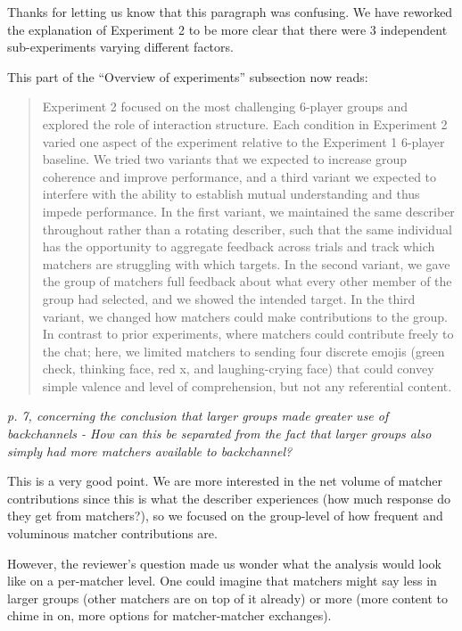 \documentclass{stanfordletter}
\newcommand{\theysaid}[1]{\begin{leftbar} \noindent 
		\textsl{ #1}\end{leftbar}}
\newcommand{\revised}[1]{\begin{quote}	#1 \end{quote}}
\begin{document}
\begin{letter}{}
Thanks for letting us know that this paragraph was confusing. We have reworked the explanation of Experiment 2 to be more clear that there were 3 independent sub-experiments varying different factors. 

This part of the ``Overview of experiments'' subsection now reads: 
          
          \revised{Experiment 2 focused on the most challenging 6-player groups and explored the role of interaction structure. Each condition in Experiment 2 varied one aspect of the experiment relative to the Experiment 1 6-player baseline. We tried two variants that we expected to increase group coherence and improve performance, and a third variant we expected to interfere with the ability to establish mutual understanding and thus impede performance. 
          	In the first variant, we maintained the same describer throughout rather than a rotating describer, such that the same individual has the opportunity to aggregate feedback across trials and track which matchers are struggling with which targets. 
          	In the second variant, we gave the group of matchers full feedback about what every other member of the group had selected, and we showed the intended target. 
          	In the third variant, we changed how matchers could make contributions to the group. In contrast to prior experiments, where matchers could contribute freely to the chat; here, we limited matchers to sending four discrete emojis (green check, thinking face, red x, and laughing-crying face) that could convey simple valence and level of comprehension, but not any referential content.}
          
          \theysaid{p. 7, concerning the conclusion that larger groups made greater use of backchannels - How can this be separated from the fact that larger groups also simply had more matchers available to backchannel?}
          
          
          This is a very good point. 
          We are more interested in the net volume of matcher contributions since this is what the describer experiences (how much response do they get from matchers?), so we focused on the group-level of how frequent and voluminous matcher contributions are. 
          
          However, the reviewer's question made us wonder what the analysis would look like on a per-matcher level. One could imagine that matchers might say less in larger groups (other matchers are on top of it already) or more (more content to chime in on, more options for matcher-matcher exchanges). 
          

\end{letter}
\end{document}
